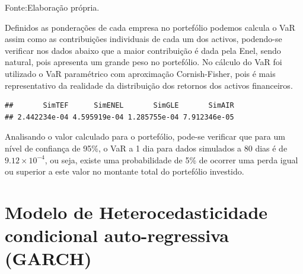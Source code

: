 \documentclass[
  12pt,
  a4paper,
  openany]{book}
\newenvironment{Shaded}{\begin{snugshade}}{\end{snugshade}}
\newcommand{\AttributeTok}[1]{\textcolor[rgb]{0.77,0.63,0.00}{#1}}
\newcommand{\CommentTok}[1]{\textcolor[rgb]{0.56,0.35,0.01}{\textit{#1}}}
\newcommand{\FloatTok}[1]{\textcolor[rgb]{0.00,0.00,0.81}{#1}}
\newcommand{\FunctionTok}[1]{\textcolor[rgb]{0.00,0.00,0.00}{#1}}
\newcommand{\NormalTok}[1]{#1}
\newcommand{\OtherTok}[1]{\textcolor[rgb]{0.56,0.35,0.01}{#1}}
\newcommand{\SpecialCharTok}[1]{\textcolor[rgb]{0.00,0.00,0.00}{#1}}
\newcommand{\StringTok}[1]{\textcolor[rgb]{0.31,0.60,0.02}{#1}}
\theoremstyle{definition}
\theoremstyle{definition}
\theoremstyle{definition}
\theoremstyle{remark}
\begin{document}
Fonte:Elaboração própria.

\justifying
\bigskip

Definidos as ponderações de cada empresa no portefólio podemos calcula o VaR assim como as contribuições individuais de cada um dos activos, podendo-se verificar nos dados abaixo que a maior contribuição é dada pela Enel, sendo natural, pois apresenta um grande peso no portefólio. No cálculo do VaR foi utilizado o VaR paramétrico com aproximação Cornish-Fisher, pois é mais representativo da realidade da distribuição dos retornos dos activos financeiros.

\scriptsize

\begin{Shaded}
\end{Shaded}

\begin{verbatim}
##       SimTEF      SimENEL       SimGLE       SimAIR 
## 2.442234e-04 4.595919e-04 1.285755e-04 7.912346e-05
\end{verbatim}

\normalsize

Analisando o valor calculado para o portefólio, pode-se verificar que para um nível de confiança de 95\%, o VaR a 1 dia para dados simulados a 80 dias é de \ensuremath{9.12\times 10^{-4}}, ou seja, existe uma probabilidade de 5\% de ocorrer uma perda igual ou superior a este valor no montante total do portefólio investido.

\hypertarget{modelo-de-heterocedasticidade-condicional-auto-regressiva-garch}{%
\section{Modelo de Heterocedasticidade condicional auto-regressiva (GARCH)}\label{modelo-de-heterocedasticidade-condicional-auto-regressiva-garch}}
\end{document}
